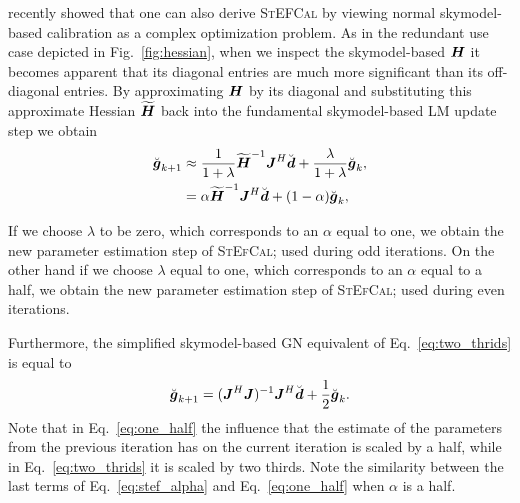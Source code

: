 \documentclass[useAMS,usenatbib]{mn2e}
\newcommand{\bg}{\bmath{g}}
\newcommand{\bd}{\bmath{d}}
\newcommand{\bJ}{\bmath{J}}
\newcommand{\bH}{\bmath{H}}
\begin{document}
\citet{Smirnov2015} recently showed that one can also derive \textsc{StEFCal} by viewing normal skymodel-based calibration as a complex optimization problem.
As in the redundant use case depicted in Fig.~\ref{fig:hessian}, when we inspect the skymodel-based $\bH$ it becomes apparent that its diagonal entries are much more significant than its off-diagonal entries.
By approximating $\bH$ by its diagonal and substituting this approximate Hessian $\widetilde{\bH}$ back into the fundamental skymodel-based LM update step we obtain \citep{Smirnov2015} 
\begin{align}
\breve{\bg}_{k+1} &\approx \frac{1}{1+\lambda}\widetilde{\bH}^{-1}\bJ^H\breve{\bd} + \frac{\lambda}{1+\lambda} \breve{\bg}_k,\label{eq:stef_lambda}\\
 &= \alpha \widetilde{\bH}^{-1}\bJ^H\breve{\bd} + (1-\alpha)\breve{\bg}_k, \label{eq:stef_alpha}  
\end{align}

If we choose $\lambda$ to be zero, which corresponds to an $\alpha$ equal to one, we obtain the new parameter estimation step of \textsc{StEfCal}; used during odd iterations. On the other hand if we choose $\lambda$ equal to one, which corresponds
to an $\alpha$ equal to a half, we obtain the new parameter estimation step of \textsc{StEfCal}; used during even iterations. 

Furthermore, the simplified skymodel-based GN equivalent of Eq.~\eqref{eq:two_thrids} is equal to
\citep{Smirnov2015}
\begin{equation}
\label{eq:one_half}
\breve{\bg}_{k+1} = (\bJ^H\bJ)^{-1}\bJ^H\breve{\bd} + \frac{1}{2}\breve{\bg}_{k}. 
\end{equation}
Note that in Eq.~\eqref{eq:one_half} the influence that the estimate of the parameters from the previous iteration has on the current iteration is scaled by a half, while
in Eq.~\eqref{eq:two_thrids} it is scaled by two thirds. Note the similarity between the last terms of Eq.~\eqref{eq:stef_alpha} and Eq.~\eqref{eq:one_half} when $\alpha$ is a half.

\label{lastpage}
\end{document}
